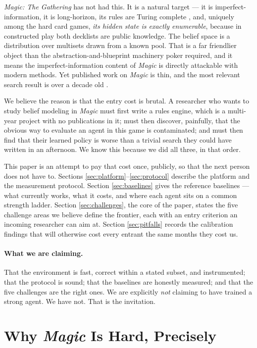 \documentclass[11pt]{article}
\newcounter{challenge}
\begin{document}
\textit{Magic: The Gathering} has not had this. It is a natural target --- it is imperfect-information, it is long-horizon, its rules are Turing complete \citep{churchill2019turing}, and, uniquely among the hard card games, \emph{its hidden state is exactly enumerable}, because in constructed play both decklists are public knowledge. The belief space is a distribution over multisets drawn from a known pool. That is a far friendlier object than the abstraction-and-blueprint machinery poker required, and it means the imperfect-information content of \textit{Magic} is directly attackable with modern methods. Yet published work on \textit{Magic} is thin, and the most relevant search result is over a decade old \citep{cowling2012magic}.

We believe the reason is that the entry cost is brutal. A researcher who wants to study belief modeling in \textit{Magic} must first write a rules engine, which is a multi-year project with no publications in it; must then discover, painfully, that the obvious way to evaluate an agent in this game is contaminated; and must then find that their learned policy is worse than a trivial search they could have written in an afternoon. We know this because we did all three, in that order.

This paper is an attempt to pay that cost once, publicly, so that the next person does not have to. Sections \ref{sec:platform}--\ref{sec:protocol} describe the platform and the measurement protocol. Section \ref{sec:baselines} gives the reference baselines --- what currently works, what it costs, and where each agent sits on a common strength ladder. Section \ref{sec:challenges}, the core of the paper, states the five challenge areas we believe define the frontier, each with an entry criterion an incoming researcher can aim at. Section \ref{sec:pitfalls} records the calibration findings that will otherwise cost every entrant the same months they cost us.

\paragraph{What we are claiming.} That the environment is fast, correct within a stated subset, and instrumented; that the protocol is sound; that the baselines are honestly measured; and that the five challenges are the right ones. We are explicitly \emph{not} claiming to have trained a strong agent. We have not. That is the invitation.

\section{Why \textit{Magic} Is Hard, Precisely}
\label{sec:why}
\end{document}

